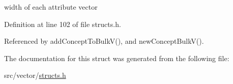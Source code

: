 width of each attribute vector 



\-Definition at line 102 of file structs.\-h.



\-Referenced by add\-Concept\-To\-Bulk\-V(), and new\-Concept\-Bulk\-V().



\-The documentation for this struct was generated from the following file\-:\begin{DoxyCompactItemize}
\item 
src/vector/\hyperlink{vector_2structs_8h}{structs.\-h}\end{DoxyCompactItemize}
